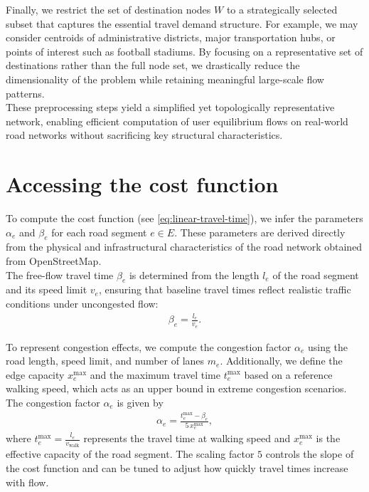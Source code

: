 \documentclass[twocolumn,english,groupedaddress, superscriptaddress,aps,pre,10pt,floatfix]{revtex4-2}
\begin{document}
Finally, we restrict the set of destination nodes $W$ to a strategically selected subset that captures the essential travel demand structure. For example, we may consider centroids of administrative districts, major transportation hubs, or points of interest such as football stadiums. By focusing on a representative set of destinations rather than the full node set, we drastically reduce the dimensionality of the problem while retaining meaningful large-scale flow patterns.\\

These preprocessing steps yield a simplified yet topologically representative network, enabling efficient computation of user equilibrium flows on real-world road networks without sacrificing key structural characteristics.


\section{Accessing the cost function}\label{sec:osm-cost-func}
To compute the cost function (see \cref{eq:linear-travel-time}), we infer the parameters $\alpha_e$ and $\beta_e$ for each road segment $e \in E$. These parameters are derived directly from the physical and infrastructural characteristics of the road network obtained from OpenStreetMap.\\

The free-flow travel time $\beta_e$ is determined from the length $l_e$ of the road segment and its speed limit $v_e$, ensuring that baseline travel times reflect realistic traffic conditions under uncongested flow:
\begin{align*}
    \beta_e = \frac{l_e}{v_e}.
\end{align*}

To represent congestion effects, we compute the congestion factor $\alpha_e$ using the road length, speed limit, and number of lanes $m_e$. Additionally, we define the edge capacity $x^{\max}_e$ and the maximum travel time $t^{\max}_e$ based on a reference walking speed, which acts as an upper bound in extreme congestion scenarios.\\

The congestion factor $\alpha_e$ is given by
\begin{align*}
    \alpha_e = \frac{t^{\max}_e - \beta_e}{5\,x^{\max}_e},
\end{align*}
where $t^{\max}_e = \frac{l_e}{v_{\mathrm{walk}}}$ represents the travel time at walking speed and $x^{\max}_e$ is the effective capacity of the road segment. The scaling factor $5$ controls the slope of the cost function and can be tuned to adjust how quickly travel times increase with flow.
\end{document}

